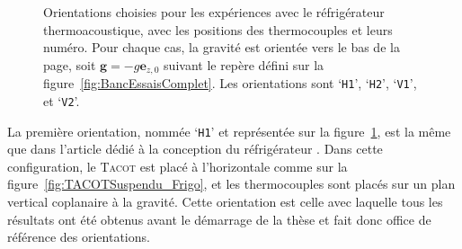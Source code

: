 \begin{figure}[!htp]
	\centering		
	\begin{subfigure}[c]{.4\textwidth}
		\centering
		
		\caption{}
		\label{fig:OrientationCore_H1}
	\end{subfigure} 
	\begin{subfigure}[c]{.4\textwidth}
		\centering
		
		\caption{}
		\label{fig:OrientationCore_H2}
	\end{subfigure} 

	\vspace{1cm}
	
	\begin{subfigure}[c]{.4\textwidth}
		\centering
		
		\caption{}
		\label{fig:OrientationCore_V1}
	\end{subfigure} 
	\begin{subfigure}[c]{.4\textwidth}
		\centering
		
		\caption{}
		\label{fig:OrientationCore_V2}
	\end{subfigure}  	
 	\caption{Orientations choisies pour les expériences avec le réfrigérateur thermoacoustique, avec les positions des thermocouples et leurs numéro. Pour chaque cas, la gravité est orientée vers le bas de la page, soit $\mathbf g=-g\mathbf e_{z,0}$ suivant le repère défini sur la figure~\ref{fig:BancEssaisComplet}. Les orientations sont   `\texttt{H1}',  `\texttt{H2}',   `\texttt{V1}', et   `\texttt{V2}'.}%
    \label{fig:OrientationCore} %
\end{figure}


La première orientation, nommée `\texttt{H1}' et représentée sur la figure~\ref{fig:OrientationCore_H1}, est la même que dans l'article dédié à la conception du réfrigérateur \cite{ramadan_design_2021}. Dans cette configuration, le \textsc{Tacot} est placé à l'horizontale comme sur la figure~\ref{fig:TACOTSuspendu_Frigo}, et les thermocouples sont placés sur un plan vertical coplanaire à la gravité. Cette orientation est celle avec laquelle tous les résultats ont été obtenus avant le démarrage de la thèse et fait donc office de référence des orientations.\smallskip

